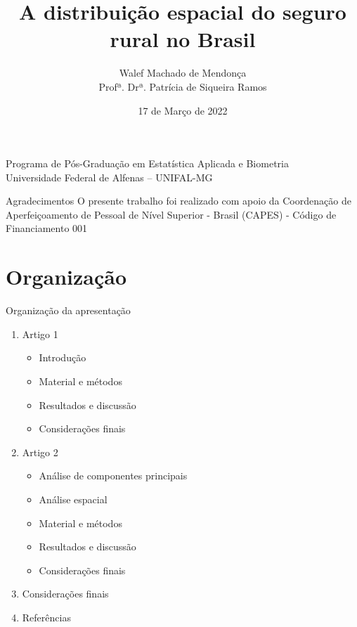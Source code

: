 \documentclass[aspectratio=169]{beamer}
\begin{document}
\title[Defesa de dissertação]{A distribuição espacial do seguro rural no Brasil}

\author[Walef Machado de Mendonça]{Walef Machado de Mendonça\\[3mm] Profª. Drª. Patrícia de Siqueira Ramos}
\date{17 de Março de 2022}

\begin{frame}{}
	\titlepage
	\begin{center}
	\footnotesize
	    Programa de Pós-Graduação em Estatística Aplicada e Biometria \\
	    Universidade Federal de Alfenas -- UNIFAL-MG
	\end{center}
\end{frame}

\begin{frame}{Agradecimentos}
	O presente trabalho foi realizado com apoio da Coordenação de Aperfeiçoamento de Pessoal de Nível Superior - Brasil (CAPES) - Código de Financiamento 001 
\end{frame}

\section{Organização}

\begin{frame}{Organização da apresentação}
		\begin{enumerate}
		    \item Artigo 1
		    \begin{itemize}
		        \item Introdução
		        \item Material e métodos
		        \item Resultados e discussão
		        \item Considerações finais
		    \end{itemize}
		    \item Artigo 2
		    \begin{itemize}
		        \item Análise de componentes principais 
		        \item Análise espacial
		        \item Material e métodos
		        \item Resultados e discussão
		        \item Considerações finais
		    \end{itemize}
		    \item Considerações finais
		    \item Referências
		\end{enumerate}
\end{frame}
\end{document}
